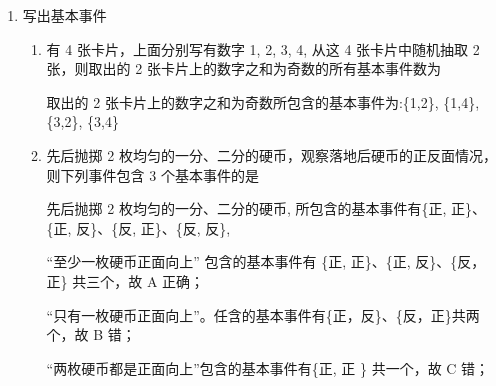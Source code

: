 \begin{enumerate}
\begin{enumerate}
\begin{jieda}
            则事件 $P = \{ 1,2\}$ 是随机事件，故 A 正确；
            
            事件 $Q = \{ 0,1,2\}$ 是必然事件,故 ${B}$ 正确;
            
            事件 $M = \{  - 1, - 2\}$ 是不可能事件,故 ${C}$ 正确;
            
            事件 $\{  - 1,0\}$ 是不可能事件,故 ${D}$ 错误.
        \end{jieda}
        \item 一个家庭有两个小孩，则样本空间可以是
    \end{enumerate}

    \item 写出基本事件
    \begin{enumerate}
        \item 有 4 张卡片，上面分别写有数字 1, 2, 3, 4, 从这 4 张卡片中随机抽取 2 张，则取出的 2 张卡片上的数字之和为奇数的所有基本事件数为
        \begin{jieda}
            取出的 2 张卡片上的数字之和为奇数所包含的基本事件为:\{1,2\}, \{1,4\}, \{3,2\}, \{3,4\}
        \end{jieda}
        
        \item 先后抛掷 2 枚均匀的一分、二分的硬币，观察落地后硬币的正反面情况，则下列事件包含 3 个基本事件的是
        \begin{jieda}
            先后抛掷 2 枚均匀的一分、二分的硬币, 所包含的基本事件有\{正, 正\}、\{正, 反\}、\{反, 正\}、\{反, 反\},
            
            “至少一枚硬币正面向上” 包含的基本事件有 \{正, 正\}、\{正, 反\}、\{反，正\} 共三个，故 A 正确；
            
            “只有一枚硬币正面向上”。任含的基本事件有\{正，反\}、\{反，正\}共两个，故 B 错；
            
            “两枚硬币都是正面向上”包含的基本事件有\{正, 正 \} 共一个，故 C 错；
            

\end{jieda}
\end{enumerate}
\end{enumerate}

